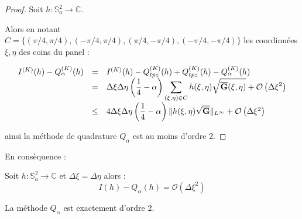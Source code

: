 \begin{proof}
Soit $h: \mathbb{S}_a^2 \rightarrow \mathbb{C}$.

Alors en notant $C=\{(\pi/4,\pi/4),(-\pi/4,\pi/4),(\pi/4,-\pi/4),(-\pi/4,-\pi/4) \}$ les coordinnées $\xi,\eta$ des coins du panel :

\begin{equation*}
\begin{array}{rcl}
I^{(K)}(h) - Q^{(K)}_{\alpha}(h) & = & I^{(K)}(h) - Q^{(K)}_{tpz}(h) + Q^{(K)}_{tpz}(h) - Q^{(K)}_{\alpha}(h)\\
                                 & = & \Delta \xi \Delta \eta \left( \dfrac{1}{4}-\alpha \right)\displaystyle\sum\limits_{(\xi,\eta)\in C} h(\xi, \eta) \sqrt{\overline{\mathbf{G}}(\xi,\eta)} + \mathcal{O}\left(\Delta \xi^2 \right)\\
                                 & \leq &   4 \Delta \xi \Delta \eta \left( \dfrac{1}{4}-\alpha \right) \| h(\xi, \eta) \sqrt{\overline{\mathbf{G}}} \|_{L^{\infty}} + \mathcal{O}\left(\Delta \xi^2 \right)
\end{array}
\end{equation*}

ainsi la méthode de quadrature $Q_{\alpha}$ est au moins d'ordre 2.
\end{proof}

En consèquence :

\begin{corollaire}
Soit $h: \mathbb{S}_a^2 \rightarrow \mathbb{C}$ et $\Delta \xi = \Delta \eta$ alors :
\begin{equation}
I(h) - Q_{\alpha}(h) = \mathcal{O} \left( \Delta \xi^2 \right)
\end{equation}
\end{corollaire}

\begin{proposition}
La méthode $Q_{\alpha}$ est exactement d'ordre 2.
\end{proposition}

